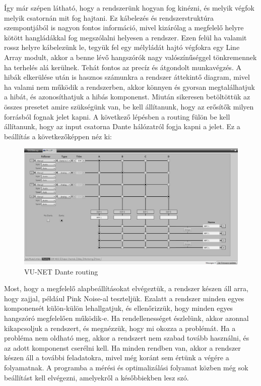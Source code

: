 Így már szépen látható, hogy a rendszerünk hogyan fog kinézni, és melyik végfok melyik csatornán mit fog hajtani.
Ez kábelezés és rendszerstruktúra szempontjából is nagyon fontos információ, mivel kizárólag a megfelelő helyre
kötött hangládákkal fog megszólalni helyesen a rendszer. Ezen felül ha valamit rossz helyre kábelezünk le, tegyük fel egy
mélyládát hajtó végfokra egy Line Array modult, akkor a benne lévő hangszórók nagy valószínűséggel tönkremennek ha terhelés alá kerülnek.
Tehát fontos az precíz és átgondolt munkavégzés. A hibák elkerülése után is hasznos számunkra a rendszer áttekintő diagram,
mivel ha valami nem működik a rendszerben, akkor könnyen és gyorsan megtalálhatjuk a hibát, és azonosíthatjuk a hibás komponenst.
Miután sikeresen betöltöttük az összes presetet amire szükségünk van, be kell állítanunk, hogy az erősítők milyen forrásból
fognak jelet kapni. A következő lépésben a routing fülön be kell állítanunk, hogy az input csatorna Dante hálózatról fogja kapni a jelet.
Ez a beállítás a következőképpen néz ki:
\begin{figure}[H]
	\centering
	\includegraphics[width=\textwidth, keepaspectratio]{figures/vunet_routing_dante.png}
	\caption{VU-NET Dante routing}\label{fig:vunet_routing_dante}
\end{figure}
Most, hogy a megfelelő alapbeállításokat elvégeztük, a rendszer készen áll arra, hogy zajjal, például
Pink Noise-al teszteljük. Ezalatt a rendszer minden egyes komponensét külön-külön lehallgatjuk, és ellenőrizzük,
hogy minden egyes hangszóró megfelelően működik-e. Ha rendellenességet észlelünk, akkor azonnal kikapcsoljuk a rendszert,
és megnézzük, hogy mi okozza a problémát. Ha a probléma nem oldható meg, akkor a rendszert nem szabad tovább használni,
és az adott komponenst cserélni kell. Ha minden rendben van, akkor a rendszer készen áll a további feladatokra, mivel
még koránt sem értünk a végére a folyamatnak. A programba a mérési és optimalizálási folyamat közben még sok beállítást kell
elvégezni, amelyekről a későbbiekben lesz szó.
